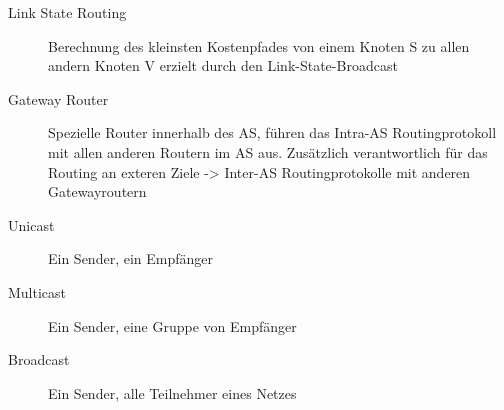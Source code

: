 \documentclass[10pt,landscape]{article}
\begin{document}
\begin{multicols}{3}
\begin{description}
    \item[Link State Routing] Berechnung des kleinsten Kostenpfades von einem Knoten S zu allen andern Knoten V erzielt durch den Link-State-Broadcast
    \item[Gateway Router] Spezielle Router innerhalb des AS, führen das Intra-AS Routingprotokoll mit allen anderen Routern im AS aus. Zusätzlich verantwortlich für das Routing an exteren Ziele -> Inter-AS Routingprotokolle mit anderen Gatewayroutern 
    \item[Unicast] Ein Sender, ein Empfänger
    \item[Multicast] Ein Sender, eine Gruppe von Empfänger
    \item[Broadcast] Ein Sender, alle Teilnehmer eines Netzes

\end{description}

\end{multicols}
\newpage
\end{document}
